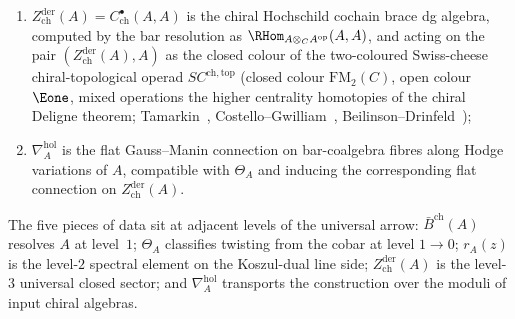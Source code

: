 \begin{theorem}
\begin{enumerate}[label=\textup{(\roman*)}]
 \item $Z^{\mathrm{der}}_{\mathrm{ch}}(A) = C^\bullet_{\mathrm{ch}}(A, A)$ is the chiral Hochschild cochain brace dg algebra, computed by the bar resolution as $\RHom_{A \otimes_C A^{\mathrm{op}}}(A, A)$, and acting on the pair $(Z^{\mathrm{der}}_{\mathrm{ch}}(A), A)$ as the closed colour of the two-coloured Swiss-cheese chiral-topological operad $SC^{\mathrm{ch}, \mathrm{top}}$ \textup{(}closed colour $\mathrm{FM}_2(C)$, open colour $\Eone$, mixed operations the higher centrality homotopies of the chiral Deligne theorem; Tamarkin~\cite{Tamarkin2007}, Costello--Gwilliam~\cite{CostelloGwilliam2017}, Beilinson--Drinfeld~\cite{BeilinsonDrinfeld}\textup{);}
 \item $\nabla_A^{\mathrm{hol}}$ is the flat Gauss--Manin connection on bar-coalgebra fibres along Hodge variations of $A$, compatible with $\Theta_A$ and inducing the corresponding flat connection on $Z^{\mathrm{der}}_{\mathrm{ch}}(A)$.
\end{enumerate}
The five pieces of data sit at adjacent levels of the universal arrow: $\bar B^{\mathrm{ch}}(A)$ resolves $A$ at level~$1$; $\Theta_A$ classifies twisting from the cobar at level $1 \to 0$; $r_A(z)$ is the level-$2$ spectral element on the Koszul-dual line side; $Z^{\mathrm{der}}_{\mathrm{ch}}(A)$ is the level-$3$ universal closed sector; and $\nabla_A^{\mathrm{hol}}$ transports the construction over the moduli of input chiral algebras.
\end{theorem}

